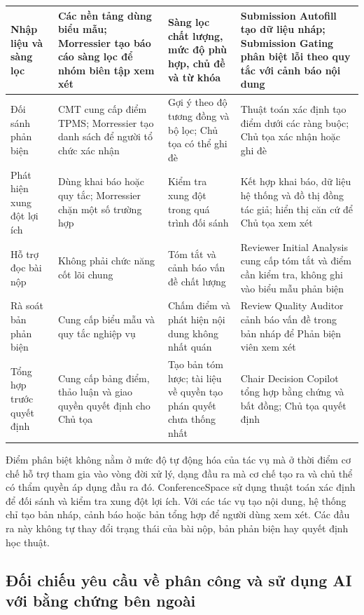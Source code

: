 \begin{longtable}{|>{\raggedright\arraybackslash}p{}|>{\raggedright\arraybackslash}p{}|>{\raggedright\arraybackslash}p{}|>{\raggedright\arraybackslash}p{}|}
Nhập liệu và sàng lọc & Các nền tảng dùng biểu mẫu; Morressier tạo báo cáo sàng lọc để nhóm biên tập xem xét & Sàng lọc chất lượng, mức độ phù hợp, chủ đề và từ khóa & Submission Autofill tạo dữ liệu nháp; Submission Gating phân biệt lỗi theo quy tắc với cảnh báo nội dung \\ \hline
Đối sánh phản biện & CMT cung cấp điểm TPMS; Morressier tạo danh sách để người tổ chức xác nhận & Gợi ý theo độ tương đồng và bộ lọc; Chủ tọa có thể ghi đè & Thuật toán xác định tạo điểm dưới các ràng buộc; Chủ tọa xác nhận hoặc ghi đè \\ \hline
Phát hiện xung đột lợi ích & Dùng khai báo hoặc quy tắc; Morressier chặn một số trường hợp & Kiểm tra xung đột trong quá trình đối sánh & Kết hợp khai báo, dữ liệu hệ thống và đồ thị đồng tác giả; hiển thị căn cứ để Chủ tọa xem xét \\ \hline
Hỗ trợ đọc bài nộp & Không phải chức năng cốt lõi chung & Tóm tắt và cảnh báo vấn đề chất lượng & Reviewer Initial Analysis cung cấp tóm tắt và điểm cần kiểm tra, không ghi vào biểu mẫu phản biện \\ \hline
Rà soát bản phản biện & Cung cấp biểu mẫu và quy tắc nghiệp vụ & Chấm điểm và phát hiện nội dung không nhất quán & Review Quality Auditor cảnh báo vấn đề trong bản nháp để Phản biện viên xem xét \\ \hline
Tổng hợp trước quyết định & Cung cấp bảng điểm, thảo luận và giao quyền quyết định cho Chủ tọa & Tạo bản tóm lược; tài liệu về quyền tạo phán quyết chưa thống nhất & Chair Decision Copilot tổng hợp bằng chứng và bất đồng; Chủ tọa quyết định \\
\end{longtable}
\endgroup

Điểm phân biệt không nằm ở mức độ tự động hóa của tác vụ mà ở thời điểm cơ chế hỗ trợ tham gia vào vòng đời xử lý, dạng đầu ra mà cơ chế tạo ra và chủ thể có thẩm quyền áp dụng đầu ra đó. ConferenceSpace sử dụng thuật toán xác định để đối sánh và kiểm tra xung đột lợi ích. Với các tác vụ tạo nội dung, hệ thống chỉ tạo bản nháp, cảnh báo hoặc bản tổng hợp để người dùng xem xét. Các đầu ra này không tự thay đổi trạng thái của bài nộp, bản phản biện hay quyết định học thuật.

\subsection{Đối chiếu yêu cầu về phân công và sử dụng AI với bằng chứng bên ngoài}

